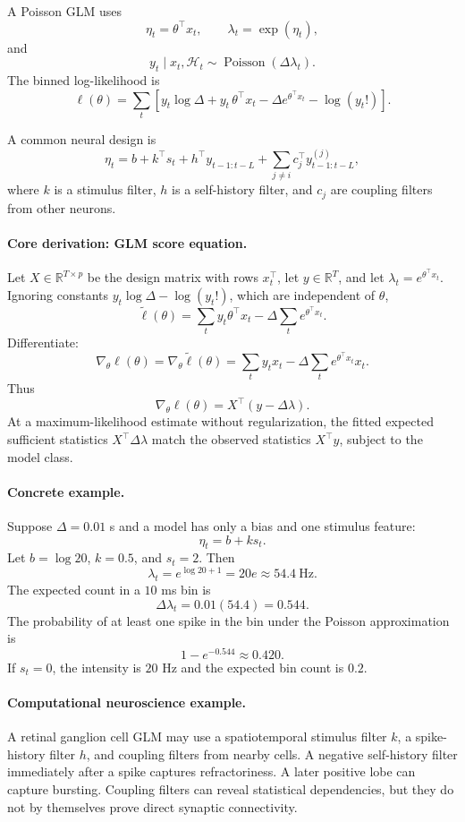 A Poisson GLM uses
\[
\eta_t=\theta^\top x_t,
\qquad
\lambda_t=\exp(\eta_t),
\]
and
\[
y_t\mid x_t,\mathcal H_t\sim\operatorname{Poisson}(\Delta\lambda_t).
\]
The binned log-likelihood is
\[
\boxed{
\ell(\theta)=
\sum_t\left[
y_t\log\Delta+y_t\,\theta^\top x_t-\Delta e^{\theta^\top x_t}-\log(y_t!)
\right].
}
\]

A common neural design is
\[
\eta_t=b+k^\top s_t+h^\top y_{t-1:t-L}
+\sum_{j\neq i} c_j^\top y^{(j)}_{t-1:t-L},
\]
where \(k\) is a stimulus filter, \(h\) is a self-history filter, and \(c_j\) are coupling filters from other neurons.

\paragraph{Core derivation: GLM score equation.}
Let \(X\in\mathbb{R}^{T\times p}\) be the design matrix with rows \(x_t^\top\), let \(y\in\mathbb{R}^T\), and let \(\lambda_t=e^{\theta^\top x_t}\). Ignoring constants \(y_t\log\Delta-\log(y_t!)\), which are independent of \(\theta\),
\[
\tilde\ell(\theta)=\sum_t y_t\theta^\top x_t-\Delta\sum_t e^{\theta^\top x_t}.
\]
Differentiate:
\[
\nabla_\theta\ell(\theta)=\nabla_\theta\tilde\ell(\theta)
=\sum_t y_t x_t-\Delta\sum_t e^{\theta^\top x_t}x_t.
\]
Thus
\[
\boxed{\nabla_\theta\ell(\theta)=X^\top(y-\Delta\lambda).}
\]
At a maximum-likelihood estimate without regularization, the fitted expected sufficient statistics \(X^\top\Delta\lambda\) match the observed statistics \(X^\top y\), subject to the model class.

\paragraph{Concrete example.}
Suppose \(\Delta=0.01\) s and a model has only a bias and one stimulus feature:
\[
\eta_t=b+k s_t.
\]
Let \(b=\log 20\), \(k=0.5\), and \(s_t=2\). Then
\[
\lambda_t=e^{\log20+1}=20e\approx54.4\ \mathrm{Hz}.
\]
The expected count in a \(10\) ms bin is
\[
\Delta\lambda_t=0.01(54.4)=0.544.
\]
The probability of at least one spike in the bin under the Poisson approximation is
\[
1-e^{-0.544}\approx0.420.
\]
If \(s_t=0\), the intensity is \(20\) Hz and the expected bin count is \(0.2\).

\paragraph{Computational neuroscience example.}
A retinal ganglion cell GLM may use a spatiotemporal stimulus filter \(k\), a spike-history filter \(h\), and coupling filters from nearby cells. A negative self-history filter immediately after a spike captures refractoriness. A later positive lobe can capture bursting. Coupling filters can reveal statistical dependencies, but they do not by themselves prove direct synaptic connectivity.

